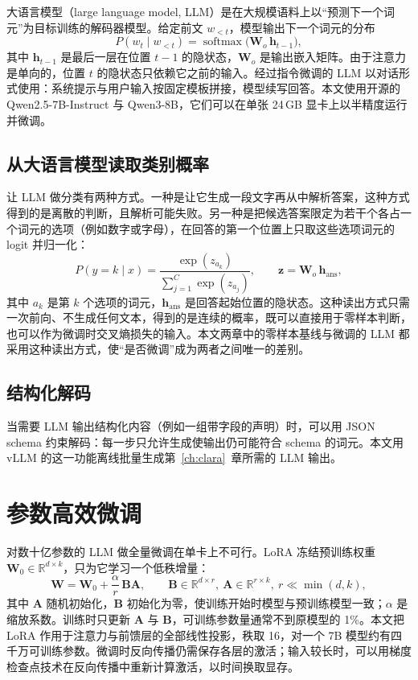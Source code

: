 大语言模型（large language model, LLM）是在大规模语料上以“预测下一个词元”为目标训练的解码器模型\citep{brown2020gpt3}。给定前文 $w_{<t}$，模型输出下一个词元的分布
\begin{equation}
P(w_t\mid w_{<t})=\operatorname{softmax}\big(\bm W_{\!o}\,\bm h_{t-1}\big),
\end{equation}
其中 $\bm h_{t-1}$ 是最后一层在位置 $t-1$ 的隐状态，$\bm W_{\!o}$ 是输出嵌入矩阵。由于注意力是单向的，位置 $t$ 的隐状态只依赖它之前的输入。经过指令微调的 LLM 以对话形式使用：系统提示与用户输入按固定模板拼接，模型续写回答。本文使用开源的 Qwen2.5-7B-Instruct\citep{qwen25} 与 Qwen3-8B\citep{qwen3}，它们可以在单张 24\,GB 显卡上以半精度运行并微调。

\subsection{从大语言模型读取类别概率}\label{sec:bg-readout}

让 LLM 做分类有两种方式。一种是让它生成一段文字再从中解析答案，这种方式得到的是离散的判断，且解析可能失败。另一种是把候选答案限定为若干个各占一个词元的选项（例如数字或字母），在回答的第一个位置上只取这些选项词元的 logit 并归一化：
\begin{equation}
P(y{=}k\mid x)=\frac{\exp(z_{a_k})}{\sum_{j=1}^{C}\exp(z_{a_j})},\qquad \bm z=\bm W_{\!o}\,\bm h_{\mathrm{ans}},\label{eq:readout}
\end{equation}
其中 $a_k$ 是第 $k$ 个选项的词元，$\bm h_{\mathrm{ans}}$ 是回答起始位置的隐状态。这种读出方式只需一次前向、不生成任何文本，得到的是连续的概率，既可以直接用于零样本判断，也可以作为微调时交叉熵损失的输入。本文两章中的零样本基线与微调的 LLM 都采用这种读出方式，使“是否微调”成为两者之间唯一的差别。

\subsection{结构化解码}

当需要 LLM 输出结构化内容（例如一组带字段的声明）时，可以用 JSON schema 约束解码：每一步只允许生成使输出仍可能符合 schema 的词元\citep{dong2024xgrammar}。本文用 vLLM\citep{kwon2023vllm} 的这一功能离线批量生成第~\ref{ch:clara}~章所需的 LLM 输出。

\section{参数高效微调}\label{sec:bg-lora}

对数十亿参数的 LLM 做全量微调在单卡上不可行。LoRA\citep{hu2022lora} 冻结预训练权重 $\bm W_0\in\mathbb R^{d\times k}$，只为它学习一个低秩增量：
\begin{equation}
\bm W=\bm W_0+\frac{\alpha}{r}\,\bm B\bm A,\qquad \bm B\in\mathbb R^{d\times r},\ \bm A\in\mathbb R^{r\times k},\ r\ll\min(d,k),
\end{equation}
其中 $\bm A$ 随机初始化，$\bm B$ 初始化为零，使训练开始时模型与预训练模型一致；$\alpha$ 是缩放系数。训练时只更新 $\bm A$ 与 $\bm B$，可训练参数量通常不到原模型的 1\%。本文把 LoRA 作用于注意力与前馈层的全部线性投影，秩取 16，对一个 7B 模型约有四千万可训练参数。微调时反向传播仍需保存各层的激活；输入较长时，可以用梯度检查点技术在反向传播中重新计算激活，以时间换取显存。

